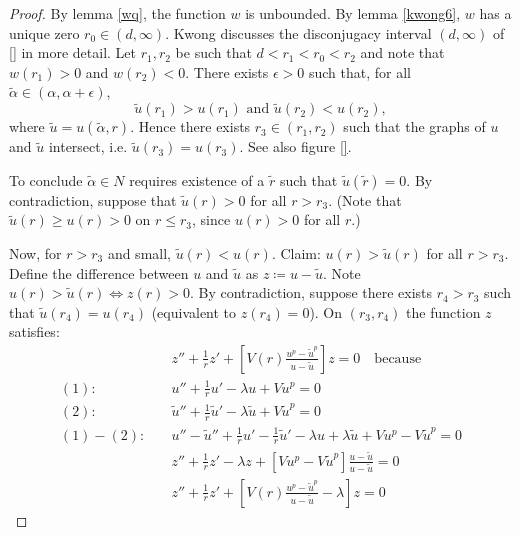 \begin{lemma}
\begin{proof}
\seperate

By lemma \ref{wq}, the function $w$ is unbounded.
By lemma \ref{kwong6}, $w$ has a unique zero $r_0\in(d,\infty)$.
Kwong discusses the disconjugacy interval $(d,\infty)$ of \ref{} in more detail.
Let $r_1,r_2$ be such that $d<r_1<r_0<r_2$ and note that $w(r_1)>0$ and $w(r_2)<0$.
There exists $\epsilon>0$ such that, for all $\tilde\alpha\in(\alpha,\alpha+\epsilon)$,
$$\tilde u(r_1)>u(r_1)\text{ and }\tilde u(r_2)<u(r_2),$$ where $\tilde u=u(\tilde\alpha,r)$.
Hence there exists $r_3\in(r_1,r_2)$ such that the graphs of $u$ and $\tilde u$ intersect,
i.e. $\tilde u(r_3)=u(r_3)$. See also figure \ref{}.

\seperate

To conclude $\tilde\alpha\in N$ requires existence of a $\tilde r$ such that $\tilde u(\tilde r)=0$.
By contradiction, suppose that $\tilde u(r)>0$ for all $r>r_3$.
(Note that $\tilde u(r)\geq u(r)>0$ on $r\leq r_3$, since $u(r)>0$ for all $r$.)

Now, for $r>r_3$ and small, $\tilde u(r)<u(r)$.
Claim: $u(r)>\tilde u(r)$ for all $r>r_3$.
Define the difference between $u$ and $\tilde u$ as $z\coloneqq u-\tilde u$.
Note $u(r)>\tilde u(r)\iff z(r)>0$.
By contradiction, suppose there exists $r_4>r_3$ such that $\tilde u(r_4)=u(r_4)$ (equivalent to $z(r_4)=0$).
On $(r_3,r_4)$ the function $z$ satisfies:
\begin{align*}
	&z''+\frac{1}{r}z'+\left[V(r)\frac{u^p-\tilde u^p}{u-\tilde u}\right]z = 0\quad\mathrm{because} \\
	(1):\quad &u'' + \frac{1}{r}u' -\lambda u + Vu^p = 0 \\
	(2):\quad &\tilde u'' + \frac{1}{r}\tilde u' -\lambda\tilde u + V\tilde u^p = 0\\
	(1) - (2):\quad &u'' - \tilde u'' + \frac{1}{r}u' - \frac{1}{r}\tilde u' -\lambda u + \lambda\tilde u + Vu^p - V\tilde u^p = 0\\
	 &z'' + \frac{1}{r}z' -\lambda z + \left[Vu^p - V\tilde u^p\right]
	\frac{u-\tilde u}{u-\tilde u} = 0\\
	 &z'' + \frac{1}{r}z' + \left[V(r)\frac{u^p-\tilde u^p}{u-\tilde u}-\lambda\right]z = 0
\end{align*}

\seperate



\end{proof}
\end{lemma}
